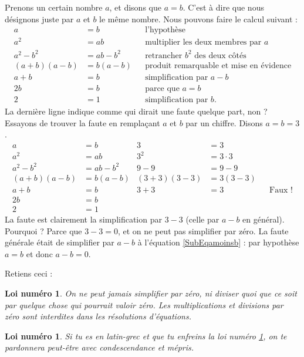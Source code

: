 \documentclass[a4paper,12pt]{book}
\newcounter{numloiphyz}
\theoremstyle{mes_exemples}	\newtheorem{exemple}[numtho]{Exemple}
\theoremstyle{mes_tho}
\newtheorem{loiphyz}[numloiphyz]{Loi numéro}
\begin{document}
Prenons un certain nombre $a$, et disons que $a=b$. C'est à dire que nous désignons juste par $a$ et $b$ le même nombre. Nous pouvons faire le calcul suivant :
\begin{subequations}
\begin{align}
a&=b&&\text{l'hypothèse}\\
a^{2}&=ab&&\text{multiplier les deux membres par $a$}\\
a^{2}-b^{2}&=ab-b^{2}&&\text{retrancher $b^{2}$ des deux côtés}\\
(a+b)(a-b)&=b(a-b)&&\text{produit remarquable et mise en évidence}\\
a+b&=b&&\text{simplification par $a-b$}  \label{SubEqamoinsb}\\
2b&=b&&\text{parce que $a=b$}\\
2&=1&&\text{simplification par $b$}.
\end{align}
\end{subequations}
La dernière ligne indique comme qui dirait une faute quelque part, non ? Essayons de trouver la faute en remplaçant $a$ et $b$ par un chiffre. Disons $a=b=3$.
\begin{subequations}
\begin{align}
a&=b&3&=3\\
a^{2}&=ab&3^{2}&=3\cdot 3\\
a^{2}-b^{2}&=ab-b^{2}&9-9&=9-9\\
(a+b)(a-b)&=b(a-b)&(3+3)(3-3)&=3(3-3)\\
a+b&=b&3+3&=3&&\text{Faux !}\\
2b&=b&&\\
2&=1&&
\end{align}
\end{subequations}
La faute est clairement la simplification par $3-3$ (celle par $a-b$ en général). Pourquoi ? Parce que $3-3=0$, et on ne peut pas simplifier par zéro. La faute générale était de simplifier par $a-b$ à l'équation \eqref{SubEqamoinsb} : par hypothèse $a=b$ et donc $a-b=0$.

Retiens ceci :

\setcounter{numloiphyz}{0}		%
\begin{loiphyz}  \label{PgLoiUnZero}
On ne peut jamais simplifier par zéro, ni diviser quoi que ce soit par quelque chose qui pourrait valoir zéro. Les multiplications et divisions par zéro sont interdites dans les résolutions d'équations.
\end{loiphyz}

\begin{loiphyz}
	Si tu es en latin-grec et que tu enfreins la loi numéro \ref{PgLoiUnZero}, on te pardonnera peut-être avec condescendance et mépris.
\end{loiphyz}
\end{document}
